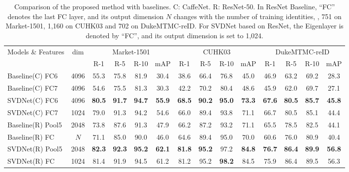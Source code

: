 \documentclass[10pt,twocolumn,letterpaper]{article}
\begin{document}
\begin{table}[]
\begin{center}
\begin{tabular}{l|c|c c c c|c c c c|c c c c}
\hline
\multicolumn{1}{c|}{\multirow{2}{*}{Models \& Features}}&\multicolumn{1}{c|}{\multirow{2}{*}{dim}}&\multicolumn{4}{c|}{Market-1501} & \multicolumn{4}{c|}{CUHK03} & \multicolumn{4}{c}{DukeMTMC-reID}\\ 
\cline{3-14}
\multicolumn{1}{c|}{}&\multicolumn{1}{c|}{}&\multicolumn{1}{c}{R-1}&{R-5}&{R-10}&{mAP}&{R-1}&{R-5}&{R-10}&{mAP}&{R-1}&{R-5}&{R-10}&{mAP}\\
\hline
Baseline(C) FC6 & 4096 &55.3&75.8&81.9&30.4 & 38.6 & 66.4& 76.8&45.0 &46.9&63.2&69.2&28.3\\

Baseline(C) FC7&4096   &54.6&75.5&81.3&30.3  &42.2&70.2&80.4&48.6    &45.9&62.0&69.7&27.1\\


SVDNet(C) FC6 &4096  &\textbf{80.5}&\textbf{91.7}&\textbf{94.7}&\textbf{55.9}
  &\textbf{68.5}&\textbf{90.2}&\textbf{95.0}&\textbf{73.3}   &\textbf{67.6}&\textbf{80.5}&\textbf{85.7}&\textbf{45.8}\\

SVDNet(C) FC7  &1024 &79.0&91.3&94.2&54.6  &66.0&89.4&93.8&71.1    &66.7&80.5&85.1&44.4\\

\hline
Baseline(R) Pool5&2048   &73.8&87.6&91.3&47.9  &66.2&87.2&93.2&71.1    &65.5&78.5&82.5&44.1\\

Baseline(R) FC   &$N$      &71.1&85.0&90.0&46.0  &64.6&89.4&95.0&70.0    &60.6&76.0&80.9&40.4\\

SVDNet(R) Pool5 &2048  &\textbf{82.3}&\textbf{92.3}&\textbf{95.2}&\textbf{62.1}  
&\textbf{81.8}&\textbf{95.2}&97.2&\textbf{84.8}   
 &\textbf{76.7}&\textbf{86.4}&\textbf{89.9}&\textbf{56.8}\\

SVDNet(R) FC    &1024  &81.4&91.9&94.5&61.2  &81.2&95.2&\textbf{98.2}&84.5    &75.9&86.4&89.5&56.3\\
\hline 
\end{tabular}

\end{center}
\setlength{\abovecaptionskip}{-0cm} 
\caption{Comparison of the proposed method with baselines. C: CaffeNet. R: ResNet-50. In ResNet Baseline, ``FC'' denotes the last FC layer, and its output dimension $N$ changes with the number of training identities, \ie, 751 on Market-1501, 1,160 on CUHK03 and 702 on DukeMTMC-reID. For SVDNet based on ResNet, the Eigenlayer is denoted by ``FC'', and its output dimension is set to 1,024.}
\label{table:cmpbasl}
\end{table}
\end{document}

